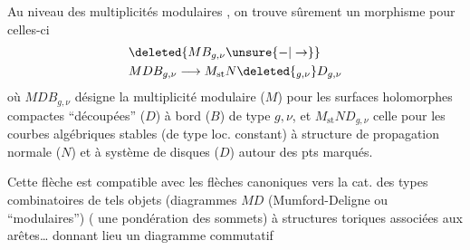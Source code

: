 Au niveau des multiplicités modulaires ,
on trouve sûrement un morphisme pour
celles-ci
\[
\begin{aligned}
&\deleted{MB_{g,\nu}\unsure{-|\to}}\\
&MDB_{g,\nu}\longrightarrow M_{\mathrm{st}}N\deleted{{}_{g,\nu}}D_{g,\nu}
\end{aligned}
\]
où $MDB_{g,\nu}$ désigne la multiplicité modulaire
($M$) pour les surfaces holomorphes compactes
``découpées'' ($D$) à bord ($B$) de type $g,\nu$, et
$M_{\mathrm{st}}ND_{g,\nu}$ celle pour les courbes algébriques
stables (de type loc. constant)  à structure de
propagation normale ($N$) et à système  de
disques ($D$) autour des pts marqués.

Cette flèche est compatible avec les
flèches canoniques vers la cat. des
types combinatoires  de tels objets
(diagrammes $MD$ (Mumford-Deligne ou
``modulaires'') (  une pondération
des sommets) à structures toriques
associées aux arêtes\ldots{} donnant lieu un
diagramme commutatif
